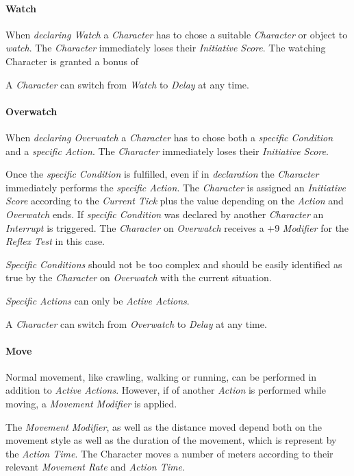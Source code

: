 \paragraph{Watch}
When \emph{declaring Watch} a \emph{Character} has to chose a suitable
\emph{Character} or object to \emph{watch}. The \emph{Character} immediately loses
their \emph{Initiative Score}. The watching Character is granted a bonus of

A \emph{Character} can switch from \emph{Watch} to \emph{Delay} at any time.

\paragraph{Overwatch}
When \emph{declaring Overwatch} a \emph{Character} has to chose both a
\emph{specific Condition} and a \emph{specific Action}. The \emph{Character}
immediately loses their \emph{Initiative Score}.

Once the \emph{specific Condition} is fulfilled, even if in \emph{declaration} the
\emph{Character} immediately performs the \emph{specific Action}. The \emph{Character}
is assigned an \emph{Initiative Score} according to the \emph{Current Tick}
plus the value depending on the \emph{Action} and \emph{Overwatch} ends.
If \emph{specific Condition} was declared by another \emph{Character} an
\emph{Interrupt} is triggered. The \emph{Character} on \emph{Overwatch} receives
a +9 \emph{Modifier} for the \emph{Reflex Test} in this case.

\emph{Specific Conditions} should not be too complex and should be easily
identified as true by the \emph{Character} on \emph{Overwatch} with the current
situation.

\emph{Specific Actions} can only be \emph{Active Actions}.

A \emph{Character} can switch from \emph{Overwatch} to \emph{Delay} at any time.

\paragraph{Move}
Normal movement, like crawling, walking or running, can be performed in addition
to \emph{Active Actions}. However, if of another \emph{Action} is performed while
moving, a \emph{Movement Modifier} is applied.

The \emph{Movement Modifier}, as well as the distance moved depend both on the
movement style as well as the duration of the movement, which is represent by the
\emph{Action Time}. The Character moves a number of meters according to their
relevant \emph{Movement Rate} and \emph{Action Time}.

